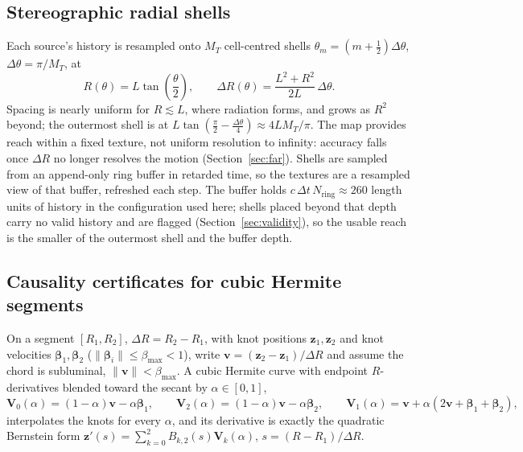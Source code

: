 \documentclass[11pt, a4paper]{article}
\begin{document}
\subsection{Stereographic radial shells}
Each source's history is resampled onto $M_T$ cell-centred shells $\theta_m = (m + \tfrac12)\Delta\theta$, $\Delta\theta = \pi/M_T$, at
\begin{equation}
R(\theta) = L\tan\!\left(\frac{\theta}{2}\right), \qquad \Delta R(\theta) = \frac{L^2 + R^2}{2L}\,\Delta\theta.
\label{eq:stereo}
\end{equation}
Spacing is nearly uniform for $R \lesssim L$, where radiation forms, and grows as $R^2$ beyond; the outermost shell is at $L\tan(\tfrac{\pi}{2} - \tfrac{\Delta\theta}{4}) \approx 4LM_T/\pi$. The map provides reach within a fixed texture, not uniform resolution to infinity: accuracy falls once $\Delta R$ no longer resolves the motion (Section~\ref{sec:far}). Shells are sampled from an append-only ring buffer in retarded time, so the textures are a resampled view of that buffer, refreshed each step. The buffer holds $c\,\Delta t\,N_{\text{ring}} \approx 260$ length units of history in the configuration used here; shells placed beyond that depth carry no valid history and are flagged (Section~\ref{sec:validity}), so the usable reach is the smaller of the outermost shell and the buffer depth.

\subsection{Causality certificates for cubic Hermite segments}
On a segment $[R_1, R_2]$, $\Delta R = R_2 - R_1$, with knot positions $\mathbf{z}_1, \mathbf{z}_2$ and knot velocities $\boldsymbol{\beta}_1, \boldsymbol{\beta}_2$ ($\|\boldsymbol{\beta}_i\| \le \beta_{\max} < 1$), write $\mathbf{v} = (\mathbf{z}_2 - \mathbf{z}_1)/\Delta R$ and assume the chord is subluminal, $\|\mathbf{v}\| < \beta_{\max}$. A cubic Hermite curve with endpoint $R$-derivatives blended toward the secant by $\alpha \in [0,1]$,
\begin{equation}
\mathbf{V}_0(\alpha) = (1-\alpha)\mathbf{v} - \alpha\boldsymbol{\beta}_1, \qquad \mathbf{V}_2(\alpha) = (1-\alpha)\mathbf{v} - \alpha\boldsymbol{\beta}_2, \qquad \mathbf{V}_1(\alpha) = \mathbf{v} + \alpha(2\mathbf{v} + \boldsymbol{\beta}_1 + \boldsymbol{\beta}_2),
\label{eq:ctrls}
\end{equation}
interpolates the knots for every $\alpha$, and its derivative is exactly the quadratic Bernstein form $\mathbf{z}'(s) = \sum_{k=0}^{2} B_{k,2}(s)\mathbf{V}_k(\alpha)$, $s = (R - R_1)/\Delta R$.
\end{document}
